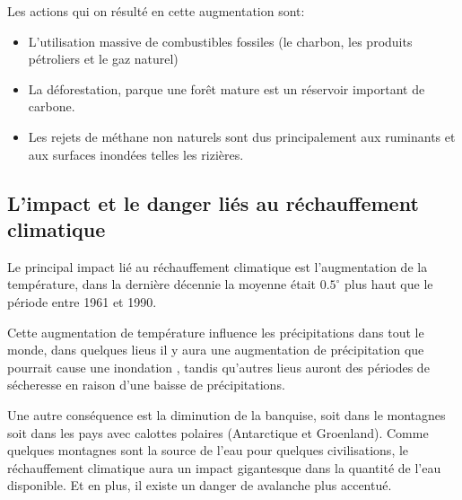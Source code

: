 \documentclass[a4paper,10pt]{article}
\begin{document}

Les actions qui on résulté en cette augmentation sont:

\begin{itemize}

\item L'utilisation massive de combustibles fossiles (le charbon, les produits
  pétroliers et le gaz naturel)

\item La  déforestation, parque une forêt  mature est un  réservoir important de
  carbone.

\item  Les  rejets  de  méthane non naturels  sont  dus  principalement  aux
  ruminants et aux surfaces inondées telles les rizières.

\end{itemize}



\subsection{L’impact et le danger liés au réchauffement climatique}

Le principal  impact lié  au réchauffement climatique  est l'augmentation  de la
température, dans la dernière décennie  la moyenne était $0.5^{\circ}$ plus haut
que le période entre 1961 et 1990.

Cette  augmentation de température  influence les  précipitations dans  tout le
monde,  dans quelques  lieus il  y aura  une augmentation  de  précipitation que
pourrait cause  une inondation , tandis  qu'autres lieus auront  des périodes de
sécheresse en raison d'une baisse de précipitations.

Une autre conséquence  est la diminution de la banquise,  soit dans le montagnes
 soit dans les pays avec calottes polaires (Antarctique et Groenland).
Comme quelques montagnes sont la source de l'eau pour quelques civilisations, le
réchauffement climatique  aura un impact  gigantesque dans la quantité  de l'eau
disponible. Et en plus, il existe un danger de avalanche plus accentué.

\end{document}
